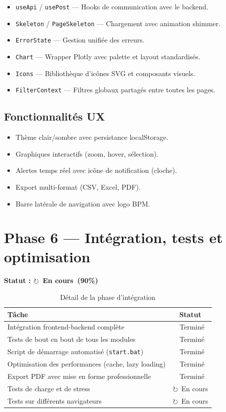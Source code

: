 \documentclass[a4paper,12pt]{report}
\newcommand{\done}{\textcolor{done}{\checkmark\ Terminé}}
\newcommand{\inprog}{\textcolor{inprogress}{$\circlearrowright$\ En cours}}
\begin{document}
\begin{itemize}
    \item \texttt{useApi} / \texttt{usePost} — Hooks de communication avec le backend.
    \item \texttt{Skeleton} / \texttt{PageSkeleton} — Chargement avec animation shimmer.
    \item \texttt{ErrorState} — Gestion unifiée des erreurs.
    \item \texttt{Chart} — Wrapper Plotly avec palette et layout standardisés.
    \item \texttt{Icons} — Bibliothèque d'icônes SVG et composants visuels.
    \item \texttt{FilterContext} — Filtres globaux partagés entre toutes les pages.
\end{itemize}

\subsection{Fonctionnalités UX}

\begin{itemize}
    \item Thème clair/sombre avec persistance localStorage.
    \item Graphiques interactifs (zoom, hover, sélection).
    \item Alertes temps réel avec icône de notification (cloche).
    \item Export multi-format (CSV, Excel, PDF).
    \item Barre latérale de navigation avec logo BPM.
\end{itemize}

\section{Phase 6 — Intégration, tests et optimisation}

\textbf{Statut : \inprog\ (90\%)}

\begin{table}[h!]
\centering
\renewcommand{\arraystretch}{1.3}
\begin{tabularx}{\textwidth}{|X|c|}
\hline
\rowcolor{bpmblue!10}
\textbf{Tâche} & \textbf{Statut} \\
\hline
Intégration frontend-backend complète & \done \\
\hline
Tests de bout en bout de tous les modules & \done \\
\hline
Script de démarrage automatisé (\texttt{start.bat}) & \done \\
\hline
Optimisation des performances (cache, lazy loading) & \done \\
\hline
Export PDF avec mise en forme professionnelle & \done \\
\hline
Tests de charge et de stress & \inprog \\
\hline
Tests sur différents navigateurs & \inprog \\
\hline
\end{tabularx}
\caption{Détail de la phase d'intégration}
\end{table}
\end{document}
